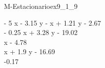 
\begin{bilevelmodel}{M-Estacionario}{ex9_1_9}
    \begin{upperlevel}{0}{
        
    }
    \end{upperlevel}
    \begin{lowerlevel}{- 5 x - 3.15 y}{
         - x + 1.21 y - 2.67  \\ 
 - 0.25 x + 3.28 y - 19.02  \\ 
 x - 4.78  \\ 
 x + 1.9 y - 16.69  \\ 
 -0.17 
    }
    \end{lowerlevel}
\end{bilevelmodel}
    
        